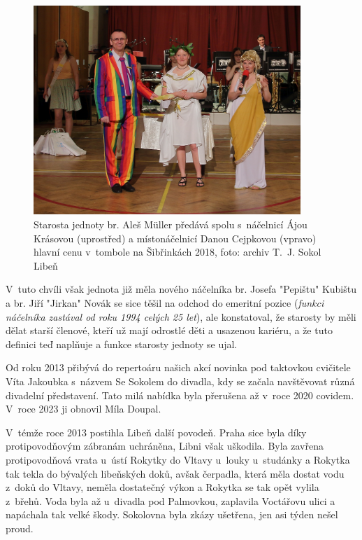 \documentclass[a5paper, 11pt, twoside]{article}
\begin{document}
\begin{figure}[h]
  \centering 
  \includegraphics[width=0.9\textwidth]{img/63_ales.jpg}
  \caption*{Starosta jednoty br. Aleš Müller předává spolu s~náčelnicí Ájou
  Krásovou (uprostřed) a místonáčelnicí Danou Cejpkovou (vpravo) hlavní
  cenu v~tombole na \mbox{Šibřinkách} 2018, foto: archiv T.~J. Sokol Libeň}
\end{figure}

V~tuto chvíli však jednota již měla nového náčelníka br. Josefa
"Pepištu" Kubištu a br. Jiří "Jirkan" Novák se sice těšil na odchod do
emeritní pozice (\textit{funkci náčelníka zastával od roku 1994 celých 25
let}), ale konstatoval, že starosty by měli dělat starší členové, kteří
už mají odrostlé děti a usazenou kariéru, a že tuto definici teď
naplňuje a funkce starosty jednoty se ujal.

Od roku 2013 přibývá do repertoáru našich akcí novinka pod taktovkou
cvičitele Víta Jakoubka s~názvem Se Sokolem do divadla, kdy se začala
navštěvovat různá divadelní představení. Tato milá nabídka byla
přerušena až v~roce 2020 covidem. V~roce 2023 ji obnovil Míla Doupal.

V~témže roce 2013 postihla Libeň další povodeň. Praha sice byla díky
protipovodňovým zábranám uchráněna, Libni však uškodila. Byla zavřena
protipovodňová vrata u~ústí Rokytky do Vltavy u~louky u~studánky a
Rokytka tak tekla do bývalých libeňských doků, avšak čerpadla, která
měla dostat vodu z~doků do Vltavy, neměla dostatečný výkon a Rokytka se
tak opět vylila z~břehů. Voda byla až u~divadla pod Palmovkou, zaplavila
Voctářovu ulici a napáchala tak velké škody. Sokolovna byla zkázy
ušetřena, jen asi týden nešel proud.
\end{document}
